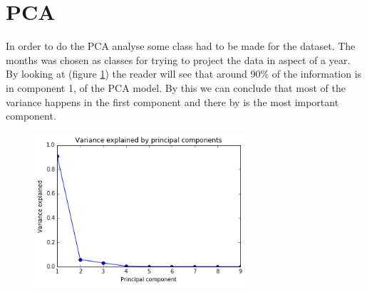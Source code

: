 \section*{PCA}
In order to do the PCA analyse some class had to be made for the dataset. The months was chosen as classes for trying to project the data in aspect of a year. 
By looking at (figure \ref{fig:pca_2}) the reader will see that around 90\% of the information is in component 1, of the PCA model. By this we can conclude that most of the variance happens in the first component and there by is the most important component. 

\vspace{-5pt}
\begin{figure}
	\centering
	\includegraphics[width=0.7\textwidth]{images/pca/pca_2.png}
	\vspace{-5pt}
	\label{fig:pca_2}
\end{figure}